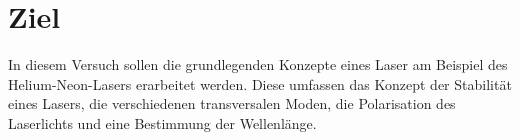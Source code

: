 \section{Ziel}
\label{sec:Ziel}
In diesem Versuch sollen die grundlegenden Konzepte eines Laser am Beispiel des Helium-Neon-Lasers erarbeitet werden.
Diese umfassen das Konzept der Stabilität eines Lasers, die verschiedenen transversalen Moden, die Polarisation des Laserlichts und eine Bestimmung der Wellenlänge.
